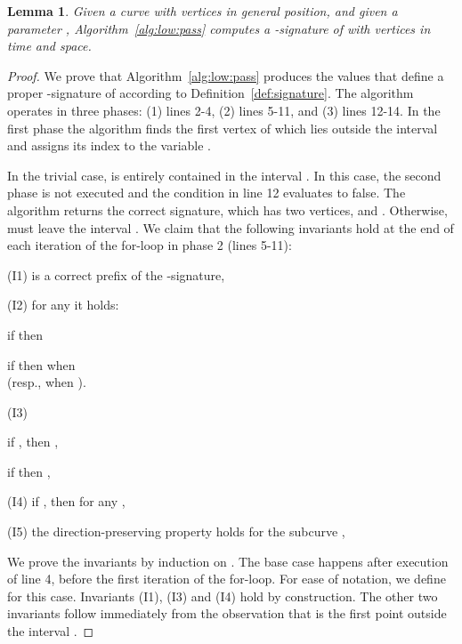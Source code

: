 \documentclass[11pt, letter]{article}
\newtheorem{lemma}[theorem]{Lemma}
\newcommand{\lemlab}[1]{\label{lemma:#1}}
\newcommand{\defref}[1]{Definition~\ref{def:#1}}
\newcommand{\algref}[1]{Algorithm~\ref{alg:#1}}
\begin{document}
\begin{lemma}\lemlab{low:pass:correct}
Given a curve  with  vertices 
in general position, and given a parameter , \algref{low:pass} computes a -signature  of  with  vertices in  time and space.
\end{lemma} 

\begin{proof}
We prove that \algref{low:pass} produces the values  that define a proper -signature
 of  according to
\defref{signature}.  The algorithm operates in three phases: (1) lines 2-4, (2)
lines 5-11, and (3) lines 12-14. In the first phase the algorithm finds the
first vertex  of  which lies outside the interval
 and assigns its index to the variable . 

In the trivial case,  is entirely contained in the interval
. In this case, the second phase is not executed and
the condition in line 12 evaluates to false. The algorithm returns the correct
signature, which has two vertices,  and .
Otherwise,  must leave the interval .
We claim that the following invariants hold at the end of each iteration of the for-loop in phase 2 (lines 5-11):
\begin{compactitem}
\item[(I1)]   is a correct prefix of the -signature,
\item[(I2)]  for any  it holds: 
\begin{compactenum}[(a)] 
\item if  then 
\item if  then  when
\\ (resp.,  when
).
\end{compactenum}
\item[(I3)]  \begin{compactenum}[(a)]
\item if , then ,
\item if  then ,
\end{compactenum}
\item[(I4)]  if , then for any  ,
\item[(I5)]  the direction-preserving property holds for the subcurve ,
\end{compactitem}
We prove the invariants by induction on . The base case happens after execution of
line 4, before the first iteration of the for-loop. For ease of notation, we
define  for this case. Invariants (I1), (I3) and (I4) hold by construction.
The other two invariants follow immediately from the observation that
 is the first point outside the interval .



\end{proof}
\end{document}
